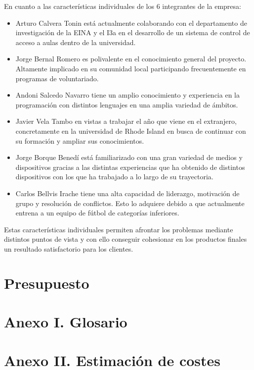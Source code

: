 \documentclass{article}
\begin{document}
En cuanto a las características individuales de los 6 integrantes de la empresa:
\begin{itemize}
   \item Arturo Calvera Tonin está actualmente colaborando con el departamento de investigación de la EINA y el I3a en el desarrollo de un sistema de control de acceso a aulas dentro de la universidad.
   \item Jorge Bernal Romero es polivalente en el conocimiento general del proyecto. Altamente implicado en su comunidad local participando frecuentemente en programas de voluntariado.
   \item Andoni Salcedo Navarro tiene un amplio conocimiento y experiencia en la programación con distintos lenguajes en una amplia variedad de ámbitos.
   \item Javier Vela Tambo en vistas a trabajar el año que viene en el extranjero, concretamente en la universidad de Rhode Island en busca de continuar con su formación y ampliar sus conocimientos.
   \item Jorge Borque Benedí está familiarizado con una gran variedad de medios y dispositivos gracias a las distintas experiencias que ha obtenido de distintos dispositivos con los que ha trabajado a lo largo de su trayectoria.
   \item Carlos Bellvis Irache tiene una alta capacidad de liderazgo, motivación de grupo y resolución de conflictos. Esto lo adquiere debido a que actualmente entrena a un equipo de fútbol de categorías inferiores.
\end{itemize}
Estas características individuales permiten afrontar los problemas mediante distintos puntos de vista y con ello conseguir cohesionar en los productos finales un resultado satisfactorio para los clientes.

\section{Presupuesto}

\section*{Anexo I. Glosario}

\section*{Anexo II. Estimación de costes}

\end{document}
